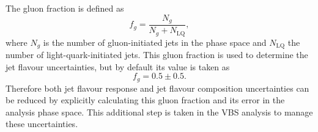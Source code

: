 The gluon fraction is defined as
\begin{equation}
  f_g = \frac{N_g}{N_g + N_\text{LQ}},
  \label{eqn:methods-systematics-fgluon}
\end{equation}
where $N_g$ is the number of gluon-initiated jets in the phase space and
$N_\text{LQ}$ the number of light-quark-initiated jets.
This gluon fraction is used to determine the jet flavour uncertainties, but by
default its value is taken as
\begin{equation*}
  f_g = 0.5 \pm 0.5.
\end{equation*}
Therefore both jet flavour response and jet flavour composition uncertainties
can be reduced by explicitly calculating this gluon fraction and its error in
the analysis phase space. This additional step is taken in the \ac{VBS} analysis
to manage these uncertainties.
